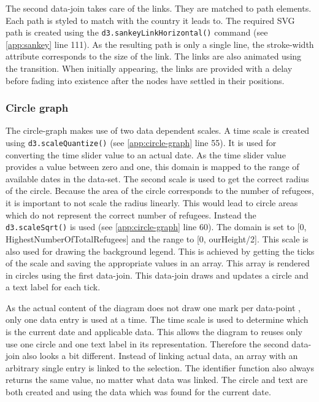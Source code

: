 The second data-join takes care of the links. They are matched to path elements. Each path is styled to match with the country it leads to. The required SVG path is created using the \texttt{d3.sankeyLinkHorizontal()} command (see \ref{app:sankey} line 111). As the resulting path is only a single line, the stroke-width attribute corresponds to the size of the link. The links are also animated using the transition. When initially appearing, the links are provided with a delay before fading into existence after the nodes have settled in their positions.

\subsubsection{Circle graph}

The circle-graph makes use of two data dependent scales. A time scale is created using \texttt{d3.scaleQuantize()} (see \ref{app:circle-graph} line 55). It is used for converting the time slider value to an actual date. As the time slider value provides a value between zero and one, this domain is mapped to the range of available dates in the data-set. The second scale is used to get the correct radius of the circle. Because the area of the circle corresponds to the number of refugees, it is important to not scale the radius linearly. This would lead to circle areas which do not represent the correct number of refugees. Instead the \texttt{d3.scaleSqrt()} is used (see \ref{app:circle-graph} line 60). The domain is set to [0, HighestNumberOfTotalRefugees] and the range to [0, ourHeight/2]. This scale is also used for drawing the background legend. This is achieved by getting the ticks of the scale and saving the appropriate values in an array. This array is rendered in circles using the first data-join. This data-join draws and updates a circle and a text label for each tick.


As the actual content of the diagram does not draw one mark per data-point , only one data entry is used at a time. The time scale is used to determine which is the current date and applicable data. This allows the diagram to reuses only use one circle and one text label in its representation. Therefore the second data-join also looks a bit different. Instead of linking actual data, an array with an arbitrary single entry is linked to the selection. The identifier function also always returns the same value, no matter what data was linked. The circle and text are both created and using the data which was found for the current date.


